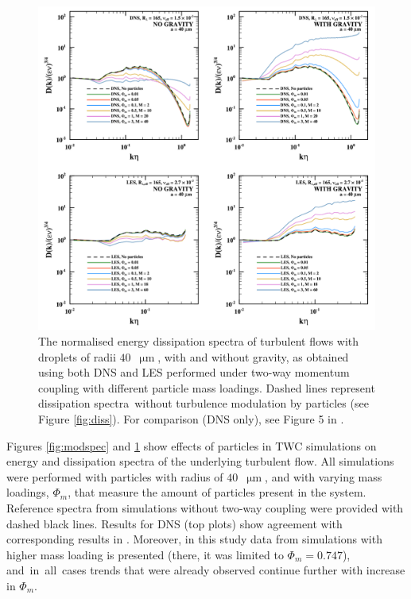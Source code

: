 \documentclass{pracamgren}
\begin{document}
\begin{figure}[h]
\centering
\includegraphics[width=13.5cm]{img/plots/2-1-4b-moddiss.pdf}
\caption{
The normalised energy dissipation spectra of turbulent flows with droplets of radii $40$~$\upmu\text{m}$, with and without gravity, as obtained using both DNS and LES performed under two-way momentum coupling with different particle mass loadings.
Dashed lines represent dissipation spectra~without turbulence modulation by particles (see Figure \ref{fig:diss}). For comparison (DNS only), see Figure 5 in \textcite{Rosa2020}.
}
\label{fig:moddiss}
\end{figure}


Figures \ref{fig:modspec} and \ref{fig:moddiss} show effects of particles in TWC simulations on energy and dissipation spectra of the underlying turbulent flow.
All simulations were performed with particles with radius of $40$~$\upmu\text{m}$, and with varying mass loadings, $\Phi_{m}$, that measure the amount of particles present in the system.
Reference spectra from simulations without two-way coupling were provided with dashed black lines.
Results for DNS (top plots) show agreement with corresponding results in \textcite[Fig.4 and 5]{Rosa2020}.
Moreover, in this study data from simulations with higher mass loading is presented (there, it was limited to $\Phi_m = 0.747$), and~in~all~cases trends that were already observed continue further with increase in $\Phi_m$.
\end{document}
